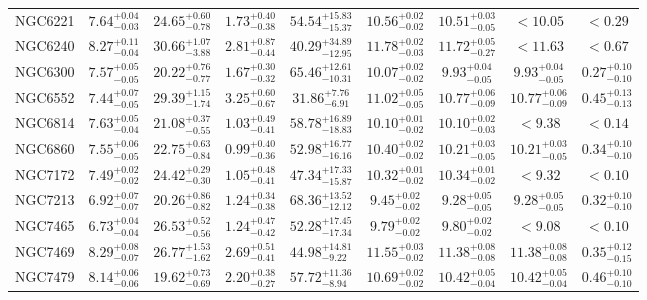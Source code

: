 \documentclass[onecolumn]{mn2e}
\begin{document}
{\begin{center}
\begin{longtable}{lcccccccc}
NGC6221 & $7.64_{-0.03}^{+0.04}$ & $24.65_{-0.78}^{+0.60}$ & $1.73_{-0.38}^{+0.40}$ &$54.54_{-15.37}^{+15.83}$ & $10.56_{-0.02}^{+0.02}$ & $10.51_{-0.05}^{+0.03}$ & $<10.05$ & $<0.29$ \\
NGC6240 & $8.27_{-0.04}^{+0.11}$ & $30.66_{-3.88}^{+1.07}$ & $2.81_{-0.44}^{+0.87}$ &$40.29_{-12.95}^{+34.89}$ & $11.78_{-0.03}^{+0.02}$ & $11.72_{-0.27}^{+0.05}$ & $<11.63$ & $<0.67$ \\
NGC6300 & $7.57_{-0.05}^{+0.05}$ & $20.22_{-0.77}^{+0.76}$ & $1.67_{-0.32}^{+0.30}$ &$65.46_{-10.31}^{+12.61}$ & $10.07_{-0.02}^{+0.02}$ & $9.93_{-0.05}^{+0.04}$ & $9.93_{-0.05}^{+0.04}$ & $0.27_{-0.10}^{+0.10}$ \\
NGC6552 & $7.44_{-0.05}^{+0.07}$ & $29.39_{-1.74}^{+1.15}$ & $3.25_{-0.67}^{+0.60}$ &$31.86_{-6.91}^{+7.76}$ & $11.02_{-0.05}^{+0.05}$ & $10.77_{-0.09}^{+0.06}$ & $10.77_{-0.09}^{+0.06}$ & $0.45_{-0.13}^{+0.13}$ \\
NGC6814 & $7.63_{-0.04}^{+0.05}$ & $21.08_{-0.55}^{+0.37}$ & $1.03_{-0.41}^{+0.49}$ &$58.78_{-18.83}^{+16.89}$ & $10.10_{-0.02}^{+0.01}$ & $10.10_{-0.03}^{+0.02}$ & $<9.38$ & $<0.14$ \\
NGC6860 & $7.55_{-0.05}^{+0.06}$ & $22.75_{-0.84}^{+0.63}$ & $0.99_{-0.36}^{+0.40}$ &$52.98_{-16.16}^{+16.77}$ & $10.40_{-0.02}^{+0.02}$ & $10.21_{-0.05}^{+0.03}$ & $10.21_{-0.05}^{+0.03}$ & $0.34_{-0.10}^{+0.10}$ \\
NGC7172 & $7.49_{-0.02}^{+0.02}$ & $24.42_{-0.30}^{+0.29}$ & $1.05_{-0.41}^{+0.48}$ &$47.34_{-15.87}^{+17.33}$ & $10.32_{-0.02}^{+0.01}$ & $10.34_{-0.02}^{+0.01}$ & $<9.32$ & $<0.10$ \\
NGC7213 & $6.92_{-0.07}^{+0.07}$ & $20.26_{-0.82}^{+0.86}$ & $1.24_{-0.38}^{+0.34}$ &$68.36_{-12.12}^{+13.52}$ & $9.45_{-0.02}^{+0.02}$ & $9.28_{-0.05}^{+0.05}$ & $9.28_{-0.05}^{+0.05}$ & $0.32_{-0.10}^{+0.10}$ \\
NGC7465 & $6.73_{-0.04}^{+0.04}$ & $26.53_{-0.56}^{+0.52}$ & $1.24_{-0.42}^{+0.47}$ &$52.28_{-17.34}^{+17.45}$ & $9.79_{-0.02}^{+0.02}$ & $9.80_{-0.02}^{+0.02}$ & $<9.08$ & $<0.10$ \\
NGC7469 & $8.29_{-0.07}^{+0.08}$ & $26.77_{-1.62}^{+1.53}$ & $2.69_{-0.41}^{+0.51}$ &$44.98_{-9.22}^{+14.81}$ & $11.55_{-0.02}^{+0.03}$ & $11.38_{-0.08}^{+0.08}$ & $11.38_{-0.08}^{+0.08}$ & $0.35_{-0.15}^{+0.12}$ \\
NGC7479 & $8.14_{-0.06}^{+0.06}$ & $19.62_{-0.69}^{+0.73}$ & $2.20_{-0.27}^{+0.38}$ &$57.72_{-8.94}^{+11.36}$ & $10.69_{-0.02}^{+0.02}$ & $10.42_{-0.04}^{+0.05}$ & $10.42_{-0.04}^{+0.05}$ & $0.46_{-0.10}^{+0.10}$ \\

\end{longtable}
\end{center}}
\end{document}
